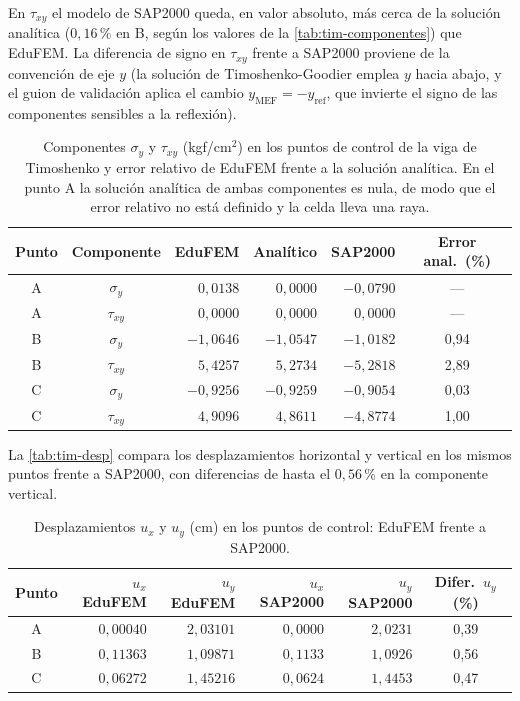 En $\tau_{xy}$ el modelo de SAP2000 queda, en valor absoluto, más cerca de la solución analítica ($0{,}16\,\%$ en B, según los valores de la \autoref{tab:tim-componentes}) que EduFEM. La diferencia de signo en $\tau_{xy}$ frente a SAP2000 proviene de la convención de eje $y$ (la solución de Timoshenko-Goodier emplea $y$ hacia abajo, y el guion de validación aplica el cambio $y_{\text{MEF}} = -y_{\text{ref}}$, que invierte el signo de las componentes sensibles a la reflexión).

\begin{table}[htbp]
\centering
\caption[Componentes $\sigma_y$ y $\tau_{xy}$ en los puntos de control de la viga de Timoshenko.]{Componentes $\sigma_y$ y $\tau_{xy}$ (kgf/cm$^2$) en los puntos de control de la viga de Timoshenko y error relativo de EduFEM frente a la solución analítica. En el punto A la solución analítica de ambas componentes es nula, de modo que el error relativo no está definido y la celda lleva una raya.}
\label{tab:tim-componentes}
\begin{tabular}{c c r r r c}
\hline
Punto & Componente & EduFEM & Analítico & SAP2000 & Error anal.\ (\%) \\
\hline
A & $\sigma_y$  & $0{,}0138$  & $0{,}0000$  & $-0{,}0790$ & --- \\
A & $\tau_{xy}$ & $0{,}0000$  & $0{,}0000$  & $0{,}0000$  & --- \\
B & $\sigma_y$  & $-1{,}0646$ & $-1{,}0547$ & $-1{,}0182$ & 0,94 \\
B & $\tau_{xy}$ & $5{,}4257$  & $5{,}2734$  & $-5{,}2818$ & 2,89 \\
C & $\sigma_y$  & $-0{,}9256$ & $-0{,}9259$ & $-0{,}9054$ & 0,03 \\
C & $\tau_{xy}$ & $4{,}9096$  & $4{,}8611$  & $-4{,}8774$ & 1,00 \\
\hline
\end{tabular}
\end{table}

La \autoref{tab:tim-desp} compara los desplazamientos horizontal y vertical en los mismos puntos frente a SAP2000, con diferencias de hasta el $0{,}56\,\%$ en la componente vertical.

\begin{table}[htbp]
\centering
\caption{Desplazamientos $u_x$ y $u_y$ (cm) en los puntos de control: EduFEM frente a SAP2000.}
\label{tab:tim-desp}
\begin{tabular}{c r r r r c}
\hline
Punto & $u_x$ EduFEM & $u_y$ EduFEM & $u_x$ SAP2000 & $u_y$ SAP2000 & Difer.\ $u_y$ (\%) \\
\hline
A & $0{,}00040$ & $2{,}03101$ & $0{,}0000$ & $2{,}0231$ & 0,39 \\
B & $0{,}11363$ & $1{,}09871$ & $0{,}1133$ & $1{,}0926$ & 0,56 \\
C & $0{,}06272$ & $1{,}45216$ & $0{,}0624$ & $1{,}4453$ & 0,47 \\
\hline
\end{tabular}
\end{table}

